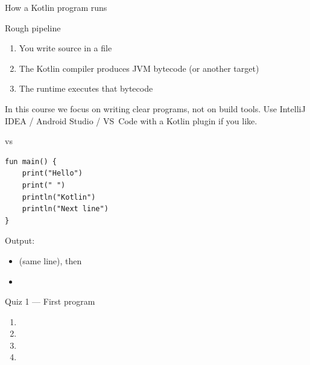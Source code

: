 \documentclass[aspectratio=169,11pt]{beamer}
\begin{document}
    \begin{frame}{How a Kotlin program runs}
        \begin{block}{Rough pipeline}
            \begin{enumerate}
                \item You write source in a  file
                \item The Kotlin compiler produces JVM bytecode (or another target)
                \item The runtime executes that bytecode
            \end{enumerate}
        \end{block}
        \vspace{0.6em}
        In this course we focus on writing clear programs, not on build tools.
        Use IntelliJ IDEA / Android Studio / VS~Code with a Kotlin plugin if you like.
    \end{frame}

    \begin{frame}[fragile]{ vs }
        \begin{lstlisting}
fun main() {
    print("Hello")
    print(" ")
    println("Kotlin")
    println("Next line")
}
        \end{lstlisting}
        \vspace{0.3em}
        Output:
        \begin{itemize}
            \item {} (same line), then
            \item {}
        \end{itemize}
        \vspace{0.4em}
    \end{frame}

    \begin{frame}{Quiz 1 --- First program}
        \begin{enumerate}
            \item {}
            \item {}
            \item {}
            \item {}
        \end{enumerate}
        \quizpause
    \end{frame}
\end{document}
